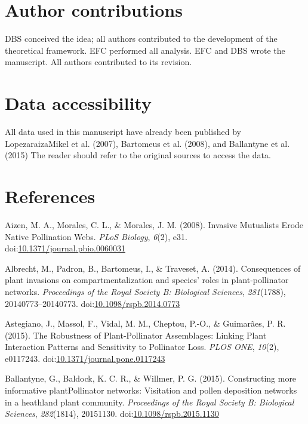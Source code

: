 \documentclass[a4paper]{artikel1}
\theoremstyle{definition}
\theoremstyle{definition}
\theoremstyle{definition}
\theoremstyle{remark}
\begin{document}
\section{Author contributions}\label{author-contributions}

DBS conceived the idea; all authors contributed to the development of
the theoretical framework. EFC performed all analysis. EFC and DBS wrote
the manuscript. All authors contributed to its revision.

\section{Data accessibility}\label{data-accessibility}

All data used in this manuscript have already been published by
Lopezaraiza\textendash{}Mikel et al. (2007), Bartomeus et al. (2008),
and Ballantyne et al. (2015) The reader should refer to the original
sources to access the data.

\section*{References}\label{references}

\hypertarget{refs}{}
\hypertarget{ref-aizen_invasive_2008}{}
Aizen, M. A., Morales, C. L., \& Morales, J. M. (2008). Invasive
Mutualists Erode Native Pollination Webs. \emph{PLoS Biology},
\emph{6}(2), e31.
doi:\href{https://doi.org/10.1371/journal.pbio.0060031}{10.1371/journal.pbio.0060031}

\hypertarget{ref-albrecht_consequences_2014}{}
Albrecht, M., Padron, B., Bartomeus, I., \& Traveset, A. (2014).
Consequences of plant invasions on compartmentalization and species'
roles in plant-pollinator networks. \emph{Proceedings of the Royal
Society B: Biological Sciences}, \emph{281}(1788), 20140773--20140773.
doi:\href{https://doi.org/10.1098/rspb.2014.0773}{10.1098/rspb.2014.0773}

\hypertarget{ref-astegiano_robustness_2015}{}
Astegiano, J., Massol, F., Vidal, M. M., Cheptou, P.-O., \& Guimarães,
P. R. (2015). The Robustness of Plant-Pollinator Assemblages: Linking
Plant Interaction Patterns and Sensitivity to Pollinator Loss.
\emph{PLOS ONE}, \emph{10}(2), e0117243.
doi:\href{https://doi.org/10.1371/journal.pone.0117243}{10.1371/journal.pone.0117243}

\hypertarget{ref-ballantyne_constructing_2015}{}
Ballantyne, G., Baldock, K. C. R., \& Willmer, P. G. (2015).
Constructing more informative plantPollinator networks: Visitation and
pollen deposition networks in a heathland plant community.
\emph{Proceedings of the Royal Society B: Biological Sciences},
\emph{282}(1814), 20151130.
doi:\href{https://doi.org/10.1098/rspb.2015.1130}{10.1098/rspb.2015.1130}
\end{document}
